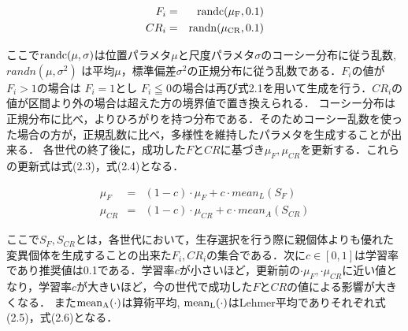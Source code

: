 \documentclass[a4paper,11pt,oneside,openany]{jsbook}
\begin{document}
\begin{eqnarray}
  F_i & = & \rm{randc}(\mu _F, 0.1) \\
  CR_i & = & \rm{randn}(\mu _{CR}, 0.1)
\end{eqnarray}

ここで$\rm{randc}(\mu,\sigma)$は位置パラメタ$\mu$と尺度パラメタ$\sigma$のコーシー分布に従う乱数,$randn(\mu,\sigma^2)$ は平均$\mu$，標準偏差$\sigma^2$の正規分布に従う乱数である．$F_i$の値が$F_i>1$の場合は
$F_i=1$とし $F_i\leqq0$の場合は再び式2.1を用いて生成を行う．$CR_i$の値が区間より外の場合は超えた方の境界値で置き換えられる．
コーシー分布は正規分布に比べ，よりひろがりを持つ分布である．そのためコーシー乱数を使った場合の方が，正規乱数に比べ，多様性を維持したパラメタを生成することが出来る．
各世代の終了後に，成功した${F}$と${CR}$に基づき$\mu_F, \mu_{CR}$を更新する．これらの更新式は式(2.3)，式(2.4)となる．

\begin{eqnarray}
  \mu_F & = & (1 - c)\cdot\mu_F + c\cdot mean_L(S_F)\\
  \mu_{CR} & = & (1 - c)\cdot\mu_{CR} + c\cdot mean_A(S_{CR})
\end{eqnarray}

ここで$S_F,S_{CR}$とは，各世代において，生存選択を行う際に親個体よりも優れた変異個体を生成することの出来た$F_i,CR_i$の集合である．次に$c\in[0,1]$は学習率であり推奨値は0.1である．学習率$c$が小さいほど，更新前の$\cdot\mu_F,\cdot\mu_{CR}$に近い値となり，学習率$c$が大きいほど，今の世代で成功した${F}$と${CR}$の値による影響が大きくなる．
また$\rm{mean}_A(\cdot)$は算術平均, $\rm{mean}_L(\cdot)$はLehmer平均でありそれぞれ式(2.5)，式(2.6)となる．
\end{document}
